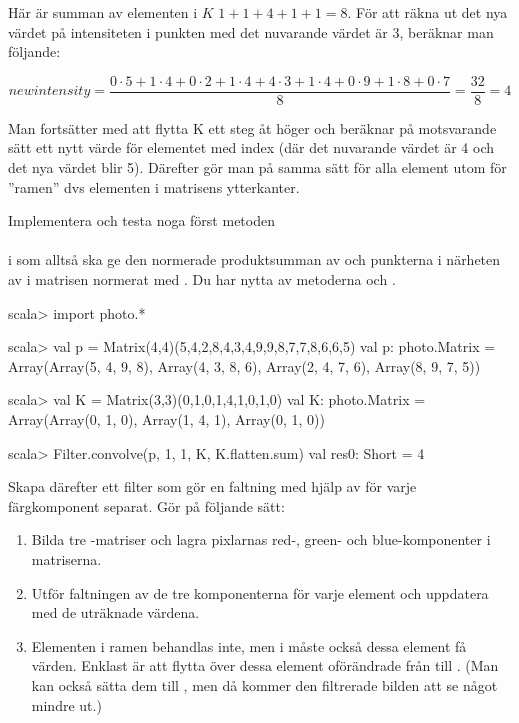 \vspace{2em}\noindent Här är summan av elementen i $K$ $1+1+4+1+1 = 8$. För att räkna ut det nya värdet på intensiteten i punkten  med det nuvarande värdet är 3, beräknar man följande:

\begin{displaymath}
\mathit{newintensity} = \frac{0 \cdot 5 + 1 \cdot 4 + 0 \cdot 2 + 1 \cdot 4 + 4 \cdot 3 + 1 \cdot 4 + 0 \cdot 9 + 1 \cdot 8 + 0 \cdot 7}{8} = \frac{32}{8} = 4
\end{displaymath}


\noindent Man fortsätter med att flytta K ett steg åt höger och beräknar på motsvarande sätt ett nytt värde för elementet med index  (där det nuvarande värdet är 4 och det nya värdet blir 5). Därefter gör man på samma sätt för alla element utom för ”ramen” dvs elementen i matrisens ytterkanter.

Implementera och testa noga först metoden\\
\\ i  som alltså ska ge den normerade produktsumman av  och punkterna i närheten av  i matrisen  normerat med .  Du har nytta av metoderna  och .

\begin{REPLnonum}
scala> import photo.*

scala> val p = Matrix(4,4)(5,4,2,8,4,3,4,9,9,8,7,7,8,6,6,5)
val p: photo.Matrix = Array(Array(5, 4, 9, 8), Array(4, 3, 8, 6), Array(2, 4, 7, 6), Array(8, 9, 7, 5))

scala> val K = Matrix(3,3)(0,1,0,1,4,1,0,1,0)
val K: photo.Matrix = Array(Array(0, 1, 0), Array(1, 4, 1), Array(0, 1, 0))

scala> Filter.convolve(p, 1, 1, K, K.flatten.sum)
val res0: Short = 4
\end{REPLnonum}

Skapa därefter ett filter  som gör en faltning med hjälp av  för varje färgkomponent separat. Gör på följande sätt:
\begin{enumerate}
	\item Bilda tre -matriser och lagra pixlarnas red-, green- och blue-komponenter i matriserna.
	\item Utför faltningen av de tre komponenterna för varje element och uppdatera  med de uträknade värdena.
	\item Elementen i ramen behandlas inte, men i  måste också dessa element få värden. Enklast är att flytta över dessa element oförändrade från  till . (Man kan också sätta dem till , men då kommer den filtrerade bilden att se något mindre ut.)
\end{enumerate}

